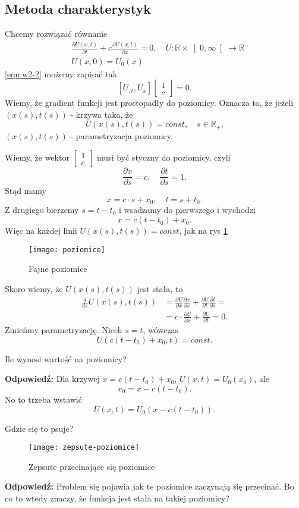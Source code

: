 \documentclass[../main.tex]{subfiles}
\begin{document}
\subsection{Metoda charakterystyk}
Chcemy rozwiązać równanie
\begin{align}
    \label{eqn:w2-2}
    &\frac{\partial U(x,t)}{\partial t} + c\frac{\partial U(x,t)}{\partial x} = 0,\quad U:\mathbb{R}\times \left]0,\infty\right[\to \mathbb{R}\\
    &U(x,0) = U_0(x)\nonumber
\end{align}
\eqref{eqn:w2-2} możemy zapisać tak
\[
    \left[ U_{,t}, U_{x} \right] \begin{bmatrix} 1\\c \end{bmatrix} = 0
.\]
Wiemy, że gradient funkcji jest prostopadły do poziomicy. Oznacza to, że jeżeli $\left(x(s), t(s)\right)$ - krzywa taka, że
\[
    U(x(s), t(s)) = const,\quad s\in \mathbb{R}_+
.\]
$\left( x(s), t(s) \right) $ - parametryzacja poziomicy.

Wiemy, że wektor $\begin{bmatrix} 1\\c \end{bmatrix} $ musi być styczny do poziomicy, czyli
    \[
        \frac{\partial x}{\partial s} = c,\quad \frac{\partial t}{\partial s} = 1
    .\]
Stąd mamy
\[
    x = c \cdot s + x_0,\quad t = s+ t_0
.\]
Z drugiego bierzemy $s = t - t_0$ i wsadzamy do pierwszego i wychodzi
\[
    x = c(t-t_0) + x_0
.\]
Więc na każdej linii $U(x(s), t(s)) = const$, jak na rys \ref{fig:poziomice}
 \begin{figure}[h]
    \centering
    \texttt{[image: poziomice]}
    \caption{Fajne poziomice}
    \label{fig:poziomice}
\end{figure}

Skoro wiemy, że $U(x(s),t(s))$ jest stała, to
\begin{align*}
    \frac{d}{ds} U\left( x(s), t(s) \right) &= \frac{\partial U}{\partial x} \frac{\partial x}{\partial s} + \frac{\partial U}{\partial t} \frac{\partial t}{\partial s} = \\
    &= c \cdot \frac{\partial U}{\partial x} + \frac{\partial U}{\partial t} = 0
.\end{align*}
Zmieńmy parametryzację. Niech $s = t$, wówczas
\[
    U\left( c(t-t_0) + x_0, t \right) = const
.\]
\begin{pytanie}
Ile wynosi wartość na poziomicy?
\end{pytanie}
\textbf{Odpowiedź: } Dla krzywej $x = c(t-t_0) + x_0$, $U(x,t) = U_0(x_0)$, ale
\[
    x_0 = x - c(t-t_0)
.\]
No to trzeba wstawić
\[
    U(x,t) = U_0\left( x - c(t-t_0) \right)
.\]
\begin{pytanie}
    Gdzie się to psuje?
\end{pytanie}
\begin{figure}[h]
    \centering
    \texttt{[image: zepsute-poziomice]}
    \caption{Zepsute przecinające się poziomice}
    \label{fig:zepsute-poziomice}
\end{figure}
\textbf{Odpowiedź: } Problem się pojawia jak te poziomice zaczynają się przecinać. Bo co to wtedy znaczy, że funkcja jest stała na takiej poziomicy?
\end{document}
